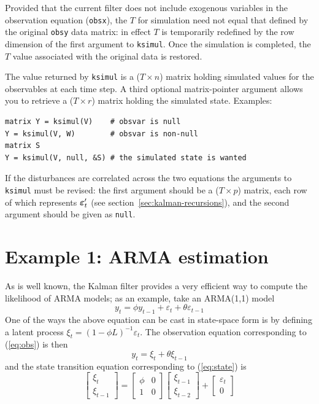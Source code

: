 \documentclass[a4paper]{article}
\newcommand{\alldist}{\ensuremath\mathbf{\bm \varepsilon}}
\begin{document}
Provided that the current filter does not include exogenous variables
in the observation equation (\texttt{obsx}), the $T$ for simulation
need not equal that defined by the original \texttt{obsy} data matrix:
in effect $T$ is temporarily redefined by the row dimension of the
first argument to \texttt{ksimul}.  Once the simulation is completed,
the $T$ value associated with the original data is restored.

The value returned by \texttt{ksimul} is a ($T \times n$) matrix
holding simulated values for the observables at each time step.  A
third optional matrix-pointer argument allows you to retrieve a ($T
\times r$) matrix holding the simulated state.  Examples:
%
\begin{verbatim}
matrix Y = ksimul(V)    # obsvar is null
Y = ksimul(V, W)        # obsvar is non-null
matrix S
Y = ksimul(V, null, &S) # the simulated state is wanted
\end{verbatim}

If the disturbances are correlated across the two equations the
arguments to \texttt{ksimul} must be revised: the first argument
should be a ($T \times p$) matrix, each row of which represents
$\alldist_t'$ (see section~\ref{sec:kalman-recursions}), and the
second argument should be given as \texttt{null}.

\section{Example 1: ARMA estimation}
\label{sec:example_arma}

As is well known, the Kalman filter provides a very efficient way to
compute the likelihood of ARMA models; as an example, take an
ARMA(1,1) model
\[
  y_t = \phi y_{t-1} + \varepsilon_t + \theta \varepsilon_{t-1}
\]
One of the ways the above equation can be cast in state-space form is
by defining a latent process $\xi_t = (1 - \phi L)^{-1}
\varepsilon_t$.   The observation equation corresponding to (\ref{eq:obs})
is then
%
\begin{equation}
y_t = \xi_t + \theta \xi_{t-1} \label{eq:arma-meas}
\end{equation}
%
and the state transition equation corresponding to (\ref{eq:state}) is
%
\[
  \left[ \begin{array}{c} \xi_t \\ \xi_{t-1} \end{array} \right] =
  \left[ \begin{array}{cc} \phi & 0 \\ 1 & 0 \end{array} \right]
  \left[ \begin{array}{c} \xi_{t-1} \\ \xi_{t-2} \end{array} \right] +
  \left[ \begin{array}{c} \varepsilon_t \\ 0 \end{array} \right] 
\]
\end{document}

